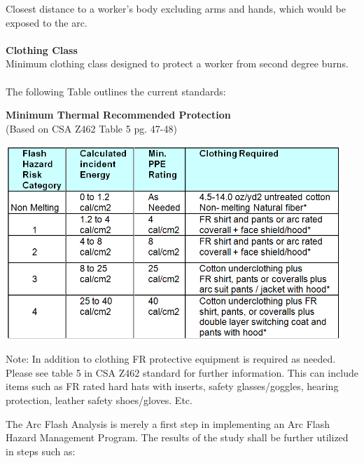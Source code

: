 Closest distance to a worker's body excluding arms and hands, which would be exposed to the arc.
\\
\\		
\textbf{Clothing Class}\\
Minimum clothing class designed to protect a worker from second degree burns.
\\
\\
The following Table outlines the current standards:
\\
\begin{center}

\textbf{Minimum Thermal Recommended Protection}\\
(Based on CSA Z462 Table 5 pg. 47-48)

\includegraphics[width=5in, keepaspectratio=true]{../Images/Clothing.png} \\

\end{center}

\noindent *Note: In addition to clothing FR protective equipment is required as needed. Please see table 5 in CSA Z462 standard for further information. This can include items such as FR rated hard hats with inserts, safety glasses/goggles, hearing protection, leather safety shoes/gloves. Etc.

\pagebreak

\noindent The Arc Flash Analysis is merely a first step in implementing an Arc Flash Hazard Management Program.  The results of the study shall be further utilized in steps such as:\\

